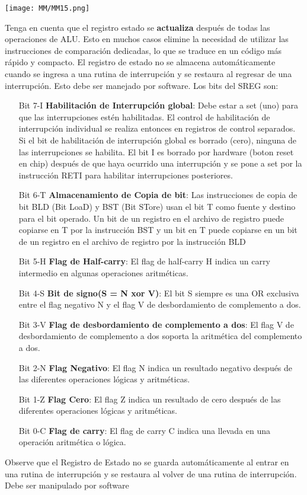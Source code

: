 \documentclass[
	12pt, %
	fleqn, %
	a4paper, %
	oneside, %
]{LegrandOrangeBook}
\begin{document}
\begin{enumerate}
\begin{center}
\texttt{[image: MM/MM15.png]}
\end{center}
Tenga en cuenta que el registro estado se \textbf{actualiza} después de todas las operaciones de ALU. Esto en muchos casos elimine la necesidad de utilizar las instrucciones de comparación dedicadas, lo que se traduce en un código más rápido y compacto. El registro de estado no se almacena automáticamente cuando se ingresa a una rutina de interrupción y se restaura al regresar de una interrupción. Esto debe ser manejado por software. Los bits del SREG son:
\begin{enumerate}
\item[Bit 7-I] \textbf{Habilitación de Interrupción global}: Debe estar a set (uno) para que las interrupciones estén habilitadas. El control de habilitación de interrupción individual se realiza entonces en registros de control separados. Si el bit de habilitación de interrupción global es borrado (cero), ninguna de las interrupciones se habilita. El bit I es borrado por hardware (boton reset en chip) después de que haya ocurrido una interrupción y se pone a set por la instrucción RETI para habilitar interrupciones posteriores.
\item[Bit 6-T] \textbf{Almacenamiento de Copia de bit}: Las instrucciones de copia de bit BLD (Bit LoaD) y BST (Bit STore) usan el bit T como fuente y destino para el bit operado. Un bit de un registro en el archivo de registro puede copiarse en T por la instrucción BST y un bit en T puede copiarse en un bit de un registro en el archivo de registro por la instrucción BLD
\item[Bit 5-H] \textbf{Flag de Half-carry}: El flag de half-carry H indica un carry intermedio en algunas operaciones aritméticas.
\item[Bit 4-S] \textbf{Bit de signo(S = N xor V)}: El bit S siempre es una OR exclusiva entre el flag negativo N y el flag V de desbordamiento de complemento a dos.
\item[Bit 3-V] \textbf{Flag de desbordamiento de complemento a dos}: El flag V de desbordamiento de complemento a dos soporta la aritmética del complemento a dos.
\item[Bit 2-N] \textbf{Flag Negativo}: El flag N indica un resultado negativo después de las diferentes operaciones lógicas y aritméticas.
\item[Bit 1-Z] \textbf{Flag Cero}: El flag Z indica un resultado de cero después de las diferentes operaciones lógicas y aritméticas.
\item[Bit 0-C] \textbf{Flag de carry}: El flag de carry C indica una llevada en una operación aritmética o
lógica.
\end{enumerate}
Observe que el Registro de Estado no se guarda automáticamente al entrar en una rutina de interrupción y se restaura al volver de una rutina de interrupción. Debe ser manipulado por software
\end{enumerate}
\end{document}
